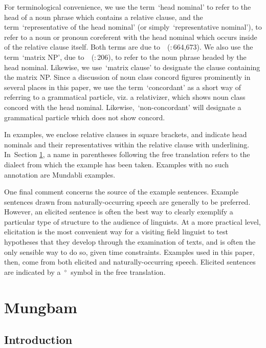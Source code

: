 \documentclass[10pt,twoside]{article}
\newcommand{\gl}[1]{`#1'}
\newcommand{\citepage}[2]{\citeauthor{#1}~{(\citeyear{#1}:\,{#2})}}
\newcommand{\sref}[1]{Section \ref{#1}}
\def\elicited{$^\diamond$}
\newcommand{\comment}[1]{\textcolor{blue}{\emph{#1}}}
\begin{document}
For terminological convenience, we use the term~\gl{head nominal}
to refer to the head of a noun phrase which contains a relative
clause, and the term~\gl{representative of the head nominal}
(or simply~\gl{representative nominal}),
to refer to a noun {or pronoun} coreferent with the head nominal which
occurs inside of
the relative clause itself. 
Both terms are due to~\citepage{lehmann:1986}{664,673}.
We also use the term~\gl{matrix NP}, due to~\citepage{andrews:2007}{206},
to refer to the noun phrase
headed by the head nominal. Likewise, we use~\gl{matrix clause} to
designate the clause containing the matrix NP. Since a discussion of noun class concord
figures prominently in several places in this paper, we use
the term~\gl{concordant} as a short way of referring to a
grammatical particle, viz. a relativizer, which shows noun class concord
with the head nominal. Likewise,~\gl{non-concordant} will designate a
grammatical particle which does not show concord.

In examples, we enclose relative clauses in square brackets, and indicate
head nominals and their representatives within the relative clause with
underlining. In~\sref{secMungbam}, a name in parentheses following the free translation refers
to the dialect from which the example has been taken.
Examples with no such annotation are Mundabli examples.


One final comment concerns the source of the example sentences. %
Example sentences drawn from naturally-occurring speech are generally
to be preferred. However, an elicited sentence is often the best way
to clearly exemplify a particular type of structure to the audience
of linguists.
At a more practical level, elicitation is the most convenient way
for a visiting field linguist to test hypotheses that they
develop through the examination of texts, and is often
the only sensible way to do so, given time constraints. Examples used in this
paper, then, come from both elicited and naturally-occurring speech.
Elicited sentences are indicated by a~\elicited~symbol in the free
translation.

%

\section{Mungbam}\label{secMungbam}
%
\subsection{Introduction}\label{secMungbamIntro}
%
\end{document}
